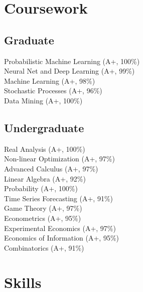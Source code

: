 \documentclass[letterpaper]{deedy-resume} %
\begin{document}
\begin{minipage}[t]{0.33\textwidth}
\sectionspace %


\section{Coursework}

\subsection{Graduate}

Probabilistic Machine Learning (A+, 100\%) \\
Neural Net and Deep Learning (A+, 99\%) \\
Machine Learning (A+, 98\%) \\
Stochastic Processes (A+, 96\%) \\
Data Mining (A+, 100\%) \\

\sectionspace %


\subsection{Undergraduate}

Real Analysis (A+, 100\%) \\
Non-linear Optimization (A+, 97\%) \\
Advanced Calculus (A+, 97\%) \\
Linear Algebra (A+, 92\%) \\
Probability (A+, 100\%) \\
Time Series Forecasting (A+, 91\%) \\
Game Theory (A+, 97\%) \\
Econometrics (A+, 95\%) \\
Experimental Economics (A+, 97\%) \\
Economics of Information (A+, 95\%) \\
Combinatorics (A+, 91\%)

\sectionspace %


\section{Skills}


\end{minipage}
\end{document}

